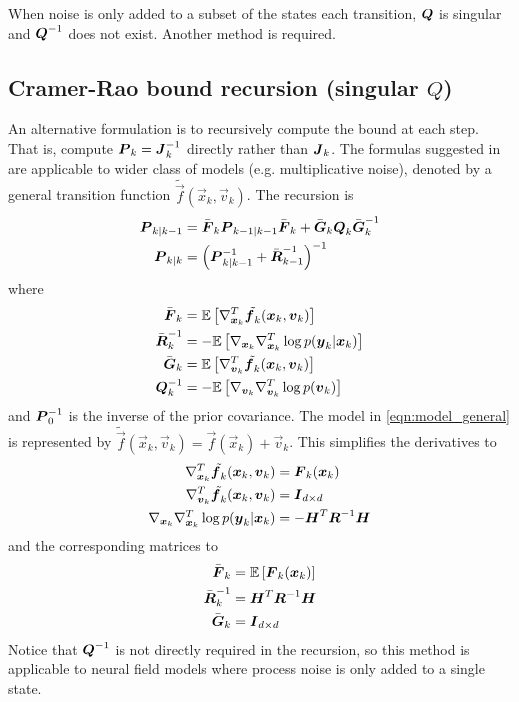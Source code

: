 \documentclass{article}
\begin{document}
When noise is only added to a subset of the states each transition, $\boldsymbol{Q}$ is singular and $\boldsymbol{Q}^{-1}$ does not exist. Another method is required.

\subsection{Cramer-Rao bound recursion (singular $Q$)} 

An alternative formulation is to recursively compute the bound at each step. That is, compute $\boldsymbol{P}_k = \boldsymbol{J}_k^{-1}$ directly rather than $\boldsymbol{J}_k$. The formulas suggested in \cite{Bergman2001} are applicable to wider class of models (e.g. multiplicative noise), denoted by a general transition function $\tilde{\vec f}(\vec x_k,\vec v_k)$. The recursion is
\begin{align}
	\boldsymbol{P}_{k|k-1} &= \bar{\boldsymbol{F}}_k\boldsymbol{P}_{k-1|k-1}\bar{\boldsymbol{F}}_k + \bar{\boldsymbol{G}}_k\boldsymbol{Q}_k \bar{\boldsymbol{G}}_k^{-1} \\
		\boldsymbol{P}_{k|k} &= \left(\boldsymbol{P}_{k|k-1}^{-1} + \bar{\boldsymbol{R}}_{k-1}^{-1}\right)^{-1}
\end{align}
where
\begin{align}
	\bar{\boldsymbol{F}}_k &= \mathbb E \left[ \nabla_{{\boldsymbol x}_k}^T \tilde{{\boldsymbol f}_k}({\boldsymbol x}_k,{\boldsymbol v}_k)\right] \\
	\bar{\boldsymbol{R}}_k^{-1} &= -\mathbb E\left[ \nabla_{{\boldsymbol x}_k}\nabla_{{\boldsymbol x}_k}^T \log p({\boldsymbol y}_k|{\boldsymbol x}_k) \right] \\
	\bar{\boldsymbol{G}}_k &= \mathbb E \left[ \nabla_{{\boldsymbol v}_k}^T \tilde{{\boldsymbol f}_k}({\boldsymbol x}_k,{\boldsymbol v}_k)\right] \\
	\boldsymbol{Q}_k^{-1} &= -\mathbb E \left[ \nabla_{{\boldsymbol v}_k}\nabla_{{\boldsymbol v}_k}^T \log p({\boldsymbol v}_k) \right]
\end{align}
and $\boldsymbol{P}_0^{-1}$ is the inverse of the prior covariance. The model in \eqref{eqn:model_general} is represented by $\tilde{\vec f}(\vec x_k,\vec v_k) = \vec f(\vec x_k) + \vec v_k$. This simplifies the derivatives to
\begin{align}
	\nabla_{{\boldsymbol x}_k}^T \tilde{{\boldsymbol f}_k}({\boldsymbol x}_k,{\boldsymbol v}_k) &= \boldsymbol{F}_k({\boldsymbol x}_k) \\
	\nabla_{{\boldsymbol v}_k}^T \tilde{{\boldsymbol f}_k}({\boldsymbol x}_k,{\boldsymbol v}_k) &= \boldsymbol{I}_{d\times d} \\
	\nabla_{{\boldsymbol x}_k}\nabla_{{\boldsymbol x}_k}^T \log p({\boldsymbol y}_k|{\boldsymbol x}_k) &= -\boldsymbol{H}^T\boldsymbol{R}^{-1} \boldsymbol{H} 
\end{align}
and the corresponding matrices to	
\begin{align}
	\bar{\boldsymbol{F}}_k &= \mathbb E\left[ \boldsymbol{F}_k({\boldsymbol x}_k)\right] \label{eqn:pcrb_term_F}\\
	\bar{\boldsymbol{R}}_k^{-1} &= \boldsymbol{H}^T\boldsymbol{R}^{-1} \boldsymbol{H} \\
	\bar{\boldsymbol{G}}_k &= \boldsymbol{I}_{d\times d} 
\end{align}
Notice that $\boldsymbol{Q}^{-1}$ is not directly required in the recursion, so this method is applicable to neural field models where process noise is only added to a single state.
\end{document}
